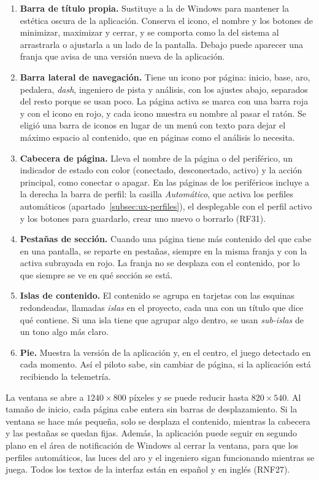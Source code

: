 \begin{enumerate}
	\item \textbf{Barra de título propia.} Sustituye a la de Windows para mantener la estética oscura de la aplicación. Conserva el icono, el nombre y los botones de minimizar, maximizar y cerrar, y se comporta como la del sistema al arrastrarla o ajustarla a un lado de la pantalla. Debajo puede aparecer una franja que avisa de una versión nueva de la aplicación.
	\item \textbf{Barra lateral de navegación.} Tiene un icono por página: inicio, base, aro, pedalera, \textit{dash}, ingeniero de pista y análisis, con los ajustes abajo, separados del resto porque se usan poco. La página activa se marca con una barra roja y con el icono en rojo, y cada icono muestra su nombre al pasar el ratón. Se eligió una barra de iconos en lugar de un menú con texto para dejar el máximo espacio al contenido, que en páginas como el análisis lo necesita.
	\item \textbf{Cabecera de página.} Lleva el nombre de la página o del periférico, un indicador de estado con color (conectado, desconectado, activo) y la acción principal, como conectar o apagar. En las páginas de los periféricos incluye a la derecha la barra de perfil: la casilla \textit{Automático}, que activa los perfiles automáticos (apartado~\ref{subsec:ux-perfiles}), el desplegable con el perfil activo y los botones para guardarlo, crear uno nuevo o borrarlo (RF31).
	\item \textbf{Pestañas de sección.} Cuando una página tiene más contenido del que cabe en una pantalla, se reparte en pestañas, siempre en la misma franja y con la activa subrayada en rojo. La franja no se desplaza con el contenido, por lo que siempre se ve en qué sección se está.
	\item \textbf{Islas de contenido.} El contenido se agrupa en tarjetas con las esquinas redondeadas, llamadas \textit{islas} en el proyecto, cada una con un título que dice qué contiene. Si una isla tiene que agrupar algo dentro, se usan \textit{sub-islas} de un tono algo más claro.
	\item \textbf{Pie.} Muestra la versión de la aplicación y, en el centro, el juego detectado en cada momento. Así el piloto sabe, sin cambiar de página, si la aplicación está recibiendo la telemetría.
\end{enumerate}

La ventana se abre a $1240\times800$ píxeles y se puede reducir hasta $820\times540$. Al tamaño de inicio, cada página cabe entera sin barras de desplazamiento. Si la ventana se hace más pequeña, solo se desplaza el contenido, mientras la cabecera y las pestañas se quedan fijas. Además, la aplicación puede seguir en segundo plano en el área de notificación de Windows al cerrar la ventana, para que los perfiles automáticos, las luces del aro y el ingeniero sigan funcionando mientras se juega. Todos los textos de la interfaz están en español y en inglés (RNF27).

